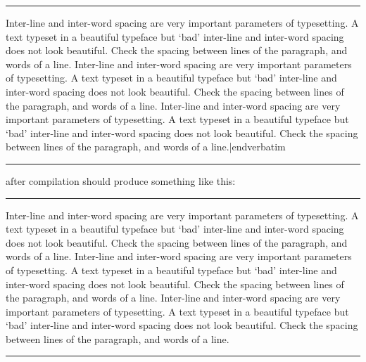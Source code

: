 {{\bigskip\hrule\vbox{\noindent\vrule\NoBlackBoxes\vbox{\vskip2mm
{\obeylines\parindent=0pt\color{brown}
\verbatim
\parindent=0pt
\fontspacing %
Inter-line and inter-word spacing are very important parameters of
typesetting. A text typeset in a beautiful typeface but `bad'
inter-line and inter-word spacing does not look beautiful. Check
the spacing between lines of the paragraph, and words of a line.
\medskip
\sixrm %
\fontspacing %
Inter-line and inter-word spacing are very important parameters of
typesetting. A text typeset in a beautiful typeface but `bad'
inter-line and inter-word spacing does not look beautiful. Check
the spacing between lines of the paragraph, and words of a line.
\medskip
\eighteenrm %
\fontspacing %
Inter-line and inter-word spacing are very important parameters of
typesetting. A text typeset in a beautiful typeface but `bad'
inter-line and inter-word spacing does not look beautiful. Check
the spacing between lines of the paragraph, and words of a line.|endverbatim}
\vskip2mm}\vrule}\hrule\BlackBoxes\bigskip


\nopagebreak\ii after compilation should produce something like this:\nopagebreak


\bigskip\hrule\vbox{\noindent\vrule\NoBlackBoxes\vbox{\vskip2mm
{\parindent=0pt
\fontspacing %
Inter-line and inter-word spacing are very important parameters of
typesetting. A text typeset in a beautiful typeface but `bad'
inter-line and inter-word spacing does not look beautiful. Check
the spacing between lines of the paragraph, and words of a line.
\medskip
\sixrm %
\fontspacing %
Inter-line and inter-word spacing are very important parameters of
typesetting. A text typeset in a beautiful typeface but `bad'
inter-line and inter-word spacing does not look beautiful. Check
the spacing between lines of the paragraph, and words of a line.
\medskip
\eighteenrm %
\fontspacing %
Inter-line and inter-word spacing are very important parameters of
typesetting. A text typeset in a beautiful typeface but `bad'
inter-line and inter-\break word spacing does not look beautiful. Check
the spacing between lines of the paragraph, and words of a line.}
\vskip2mm}\vrule}\hrule\BlackBoxes\bigskip\bigskip

}}

